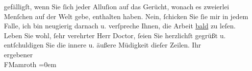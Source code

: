 \begin{ledgroupsized}[t]{13cm}
                    gefälligſt, wenn Sie ſich jeder Alluſion {\pb}auf das Gerücht, wonach es zweierlei
                    Menſchen auf der Welt gebe, enthalten haben. Nein, ſchicken Sie ſie mir in jedem
                    Falle, ich bin neugierig darnach u. verſpreche Ihnen, die Arbeit \uline{bald} zu leſen.\pend
           \pstart
           Leben Sie wohl, ſehr verehrter Herr Doctor, ſeien Sie herzlichſt gegrüßt u.
                    entſchuldigen Sie die innere u. äußere Müdigkeit dieſer Zeilen.\pend
           \pstart
           Ihr{\\[\baselineskip]}ergebener{\\[\baselineskip]}\spacefill\mbox{FMamroth}\pend
           \leftskip=0em{}
         
         \endnumbering{}\end{ledgroupsized}  \newcommand{\dateiname}{L00135}\newcommand{\titel}{Fedor Mamroth an Arthur Schnitzler, 17. 11. 1892}\newcommand{\editorInnen}{Martin Anton Müller und Gerd-Hermann Susen}
      